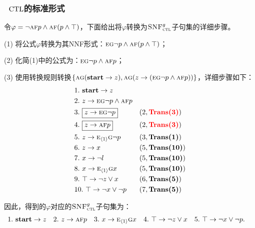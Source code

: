 \documentclass[9pt, CJK]{beamer}
\begin{document}
	\begin{frame}
		\frametitle{~$\textrm{CTL}$的标准形式}
		\begin{example}\label{examp:Tran}
			\tiny
			令$\varphi=\neg \textsc{a} \textsc{f} p \wedge \textsc{a}\textsc{f}(p \wedge \top)$，下面给出将$\varphi$转换为${\textsc{SNF}_{\textsc{ctl}}^g}$子句集的详细步骤。
			
			(1) 将公式$\varphi$转换为其NNF形式：$\textsc{e}\textsc{g} \neg p \wedge \textsc{a}\textsc{f}(p \wedge \top)$；
			
			(2) 化简(1)中的公式为：$\textsc{e}\textsc{g} \neg p \wedge \textsc{a}\textsc{f} p$；
			
			(3) 使用转换规则转换$\{\textsc{a}\textsc{g}(\textbf{start} \rightarrow z), \textsc{a}\textsc{g}(z \rightarrow (\textsc{e}\textsc{g} \neg p \wedge \textsc{a}\textsc{f} p))\}$，详细步骤如下：
			\begin{align*}
				&1.\ \textbf{start} \rightarrow z && \\
				&2.\ z \rightarrow \textsc{e}\textsc{g} \neg p \wedge \textsc{a}\textsc{f} p &&  \\
				& 3.\ \boxed{z \rightarrow  \textsc{e}\textsc{g} \neg p} && (2, \textcolor{red}{\textbf{Trans(3)}})\\
				&4.\ \boxed{z \rightarrow \textsc{a}\textsc{f} p} && (2, \textcolor{red}{\textbf{Trans(3)}})\\
				&5.\ z \rightarrow  \textsc{e}_{{\langle{1}\rangle}}\textsc{g} \neg p  && (3, \textbf{Trans(1)})\\
				&6.\ z \rightarrow x && (5, \textbf{Trans(10)})\\
				&7.\ x\rightarrow \neg l && (5, \textbf{Trans(10)})\\
				&8.\ x\rightarrow \textsc{e}_{{\langle{1}\rangle}} \textsc{g} x&& (5, \textbf{Trans(10)})\\
				&9.\ \top \rightarrow \neg z \vee x && (6, \textbf{Trans(5)}) \\
				&10.\ \top \rightarrow \neg x \vee \neg p && (7, \textbf{Trans(5)}) 
			\end{align*}
			
			因此，得到的$\varphi$对应的${\textsc{SNF}_{\textsc{ctl}}^g}$子句集为：
			\begin{align*}
				&1.\ \textbf{start} \rightarrow z && 2.\ z \rightarrow \textsc{a}\textsc{f} p && 3.\ x\rightarrow \textsc{e}_{{\langle{1}\rangle}} \textsc{g} x
				&& 4.\ \top \rightarrow \neg z \vee x && 5.\ \top \rightarrow \neg x \vee \neg p.
			\end{align*}
		\end{example}
	\end{frame}
	
\end{document}
